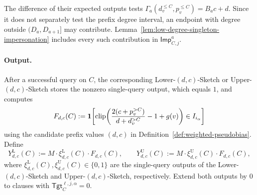 The difference of their expected outputs tests $\Gamma_a(d_v^{\le C},p_v^{\le C})=B_ac+d$. Since it does not separately test the prefix degree interval, an endpoint with degree outside $(D_a,D_{a+1}]$ may contribute. Lemma~\ref{lem:low-degree-singleton-impersonation} includes every such contribution in $\mathsf{Imp}^{a}_{C,j}$.

\paragraph{Output.}
After a successful query on $C$, the corresponding Lower-$(d,c)$-Sketch or Upper-$(d,c)$-Sketch stores the nonzero single-query output, which equals $1$, and computes
\[
F_{d,c}(C)
:=
\mathbf 1\!\left[
\operatorname{clip}\!\left(
\frac{2(c+p_v^{>C})}{d+d_v^{>C}}-1+g(v)
\right)\in I_{i_\alpha}
\right]
\]
using the candidate prefix values $(d,c)$ in Definition~\ref{def:weighted-pseudobias}. Define
\[
Y_{d,c}^{\mathrm L}(C):=M\cdot \xi^{\mathrm L}_{d,c}(C)\cdot F_{d,c}(C),
\qquad
Y_{d,c}^{\mathrm U}(C):=M\cdot \xi^{\mathrm U}_{d,c}(C)\cdot F_{d,c}(C),
\]
where $\xi^{\mathrm L}_{d,c}(C),\xi^{\mathrm U}_{d,c}(C)\in\{0,1\}$ are the single-query outputs of the Lower-$(d,c)$-Sketch and Upper-$(d,c)$-Sketch, respectively. Extend both outputs by $0$ to clauses with $\mathsf{Tgt}^{\ell,j,\alpha}_{C}=0$.

